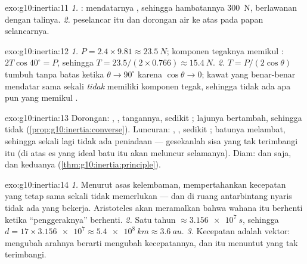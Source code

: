 \begin{solution}{exo:g10:inertia:11}
\emph{1.} :  mendatarnya ,
sehingga hambatannya \qty{300}{N}, berlawanan dengan talinya.
\emph{2.}  peselancar itu dan dorongan air ke atas pada papan
selancarnya.
\end{solution}

\begin{solution}{exo:g10:inertia:12}
\emph{1.} $P = 2.4 \times 9.81 \approx \qty{23.5}{N}$; komponen
tegaknya memikul : $2T\cos 40^\circ = P$, sehingga
$T = 23.5/(2 \times 0.766) \approx \qty{15.4}{N}$. \emph{2.}
$T = P/(2\cos\theta)$ tumbuh tanpa batas ketika $\theta \to 90^\circ$
karena $\cos\theta \to 0$; kawat yang benar-benar mendatar sama sekali
\emph{tidak} memiliki komponen tegak, sehingga tidak ada apa pun yang
memikul .
\end{solution}

\begin{solution}{exo:g10:inertia:13}
Dorongan: , ,  tangannya, sedikit ;
lajunya bertambah, sehingga  tidak 
(\cref{prop:g10:inertia:converse}). Luncuran: , ,
sedikit ; batunya melambat, sehingga sekali lagi tidak ada
peniadaan --- gesekanlah sisa yang tak terimbangi itu (di atas es yang
ideal batu itu akan meluncur selamanya). Diam:  dan 
saja, dan keduanya 
(\cref{thm:g10:inertia:principle}).
\end{solution}

\begin{solution}{exo:g10:inertia:14}
\emph{1.} Menurut asas kelembaman, mempertahankan kecepatan yang tetap
sama sekali tidak memerlukan  --- dan di ruang antarbintang nyaris
tidak ada  yang bekerja. Aristoteles akan meramalkan bahwa wahana
itu berhenti ketika ``penggeraknya'' berhenti. \emph{2.} Satu tahun
$\approx \qty{3.156e7}{s}$, sehingga
$d = 17 \times \num{3.156e7} \approx \qty{5.4e8}{km} \approx
\qty{3.6}{au}$. \emph{3.} Kecepatan adalah vektor: mengubah arahnya
berarti mengubah kecepatannya, dan itu menuntut  yang tak
terimbangi.
\end{solution}

